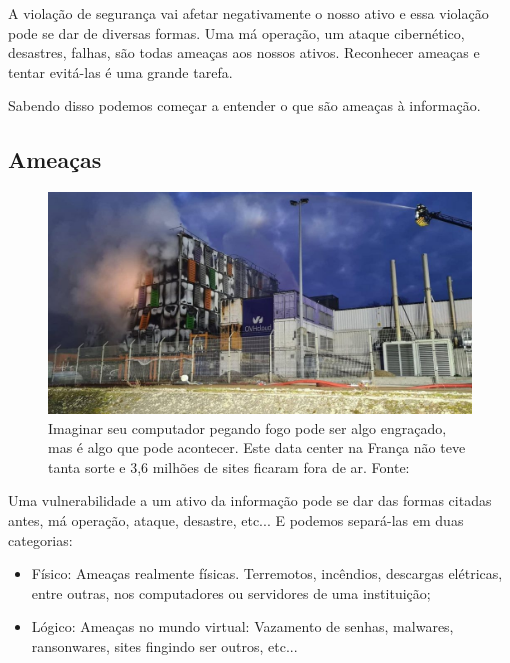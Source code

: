 A violação de segurança vai afetar negativamente o nosso ativo e essa violação pode se dar de diversas formas. Uma má operação, um ataque cibernético, desastres, falhas, são todas ameaças aos nossos ativos. Reconhecer ameaças e tentar evitá-las é uma grande tarefa.

Sabendo disso podemos começar a entender o que são ameaças à informação.

\subsection{Ameaças}

\begin{figure}[htb]
    \centering
    \includegraphics[width=\textwidth]{img/incendio.jpeg}
    \caption{Imaginar seu computador pegando fogo pode ser algo engraçado, mas é algo que pode acontecer. Este data center na França não teve tanta sorte e 3,6 milhões de sites ficaram fora de ar. Fonte:\cite{incendio}}
    \label{fig:incendio}
\end{figure}

Uma vulnerabilidade a um ativo da informação pode se dar das formas citadas antes, má operação, ataque, desastre, etc... E podemos separá-las em duas categorias:

\begin{itemize}
    \item Físico: Ameaças realmente físicas. Terremotos, incêndios, descargas elétricas, entre outras, nos computadores ou servidores de uma instituição;
    \item Lógico: Ameaças no mundo virtual: Vazamento de senhas, malwares, ransonwares, sites fingindo ser outros, etc...
\end{itemize}

